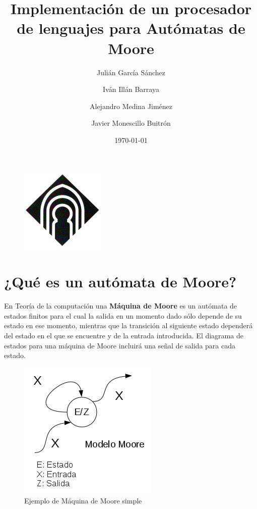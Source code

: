 \documentclass[12pt,a4paper]{article}
\author{Julián García Sánchez \and Iván Illán Barraya \and Alejandro Medina Jiménez \and Javier Monescillo Buitrón}
\title{Implementación de un procesador de lenguajes para Autómatas de Moore}
\date{\today}
\begin{document}
	
	\maketitle
	
	\begin{figure}[h]
		\centering
		\includegraphics[width=0.25
		\linewidth]{img/image004}
		\caption{}
		\label{fig:image004}
	\end{figure}

	\newpage
	\tableofcontents
	\newpage
	
	\section{¿Qué es un autómata de Moore?}
	En Teoría de la computación una \textbf{Máquina de Moore} es un autómata de estados finitos para el cual la salida en un momento dado sólo depende de su estado en ese momento, mientras que la transición al siguiente estado dependerá del estado en el que se encuentre y de la entrada introducida.
	\newline
	El diagrama de estados para una máquina de Moore incluirá una señal de salida para cada estado. \cite{Moore1}
	
	\begin{figure}[h]
		\centering
		\includegraphics[width=0.5
		\linewidth]{img/Modelo-moore}
		\caption{Ejemplo de Máquina de Moore simple}
		\label{fig:modelo-moore}
	\end{figure}
	
	
\end{document}
